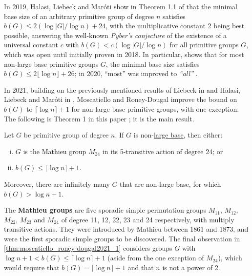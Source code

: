 In 2019, Halasi, Liebeck and Mar\'oti show in Theorem 1.1 of \cite{halasi2019} that the minimal base size of an arbitrary primitive group of degree $n$ satisfies $b(G) \leq 2(\log|G|/\log n) + 24$, with the multiplicative constant 2 being best possible, answering the well-known \textit{Pyber's conjecture} of the existence of a universal constant $c$ with $b(G) < c(\log|G|/\log n)$ for all primitive groups $G$, which was open until initially proven in 2018. In particular, \cite{halasi2019} shows that for most non-large base primitive groups $G$, the minimal base size satisfies $b(G) \leq 2\lfloor\log n\rfloor + 26$; in 2020, ``most'' was improved to \textit{``all''} \cite{moscatiello_roney-dougal2021}.

In 2021, building on the previously mentioned results of Liebeck in \cite{liebeck1984} and Halasi, Liebeck and Mar\'oti in \cite{halasi2019}, Moscatiello and Roney-Dougal improve the bound on $b(G)$ to $\lceil\log n\rceil + 1$ for non-large base primitive groups, with one exception. The following is Theorem 1 in this paper \cite{moscatiello_roney-dougal2021}; it is the main result.

\begin{theorem}\label{thm:moscatiello_roney-dougal2021_1}
    Let $G$ be primitive group of degree $n$. If $G$ is non-\hyperref[def:large_base]{large base}, then either:
    \begin{enumerate}[(i)]
        \item $G$ is the Mathieu group $M_{24}$ in its 5-transitive action of degree 24; or
        \item $b(G) \leq \lceil\log n\rceil + 1$.
    \end{enumerate}
    Moreover, there are infinitely many $G$ that are non-large base, for which $b(G) > \log n + 1$.
\end{theorem}

The \textbf{Mathieu groups} are five sporadic simple permutation groups $M_{11}$, $M_{12}$, $M_{22}$, $M_{23}$ and $M_{24}$ of degree 11, 12, 22, 23 and 24 respectively, with multiply transitive actions. They were introduced by Mathieu between 1861 and 1873, and were the first sporadic simple groups to be discovered. The final observation in \autoref{thm:moscatiello_roney-dougal2021_1} considers groups $G$ with $\log n + 1 < b(G) \leq \lceil\log n\rceil + 1$ (aside from the one exception of $M_{24}$), which would require that $b(G) = \lceil\log n\rceil + 1$ and that $n$ is not a power of 2.

